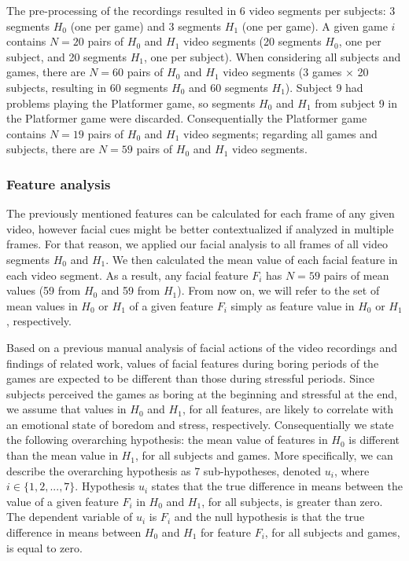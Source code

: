 The pre-processing of the recordings resulted in 6 video segments per subjects: 3 segments $H_0$ (one per game) and 3 segments $H_1$ (one per game). A given game $i$ contains $N=20$ pairs of $H_0$ and $H_1$ video segments (20 segments $H_0$, one per subject, and 20 segments $H_1$, one per subject). When considering all subjects and games, there are $N=60$ pairs of $H_0$ and $H_1$ video segments (3 games $\times$ 20 subjects, resulting in 60 segments $H_0$ and 60 segments $H_1$). Subject 9 had problems playing the Platformer game, so segments $H_0$ and $H_1$ from subject 9 in the Platformer game were discarded. Consequentially the Platformer game contains $N=19$ pairs of $H_0$ and $H_1$ video segments; regarding all games and subjects, there are $N=59$ pairs of $H_0$ and $H_1$ video segments.

\subsubsection{Feature analysis}

The previously mentioned features can be calculated for each frame of any given video, however facial cues might be better contextualized if analyzed in multiple frames. For that reason, we applied our facial analysis to all frames of all video segments $H_0$ and $H_1$. We then calculated the mean value of each facial feature in each video segment. As a result, any facial feature $F_i$ has $N=59$ pairs of mean values (59 from $H_0$ and 59 from $H_1$). From now on, we will refer to the set of mean values in $H_0$ or $H_1$ of a given feature $F_i$ simply as feature value in $H_0$ or $H_1$, respectively.

Based on a previous manual analysis of facial actions of the video recordings \cite{bevilacqua2016variations} and findings of related work, values of facial features during boring periods of the games are expected to be different than those during stressful periods. Since subjects perceived the games as boring at the beginning and stressful at the end, we assume that values in $H_0$ and $H_1$, for all features, are likely to correlate with an emotional state of boredom and stress, respectively. Consequentially we state the following overarching hypothesis: the mean value of features in $H_0$ is different than the mean value in $H_1$, for all subjects and games. More specifically, we can describe the overarching hypothesis as 7 sub-hypotheses, denoted $u_i$, where $i \in \{1, 2, ..., 7\}$. Hypothesis $u_i$ states that the true difference in means between the value of a given feature $F_i$ in $H_0$ and $H_1$, for all subjects, is greater than zero. The dependent variable of $u_i$ is $F_i$ and the null hypothesis is that the true difference in means between $H_0$ and $H_1$ for feature $F_i$, for all subjects and games, is equal to zero.

